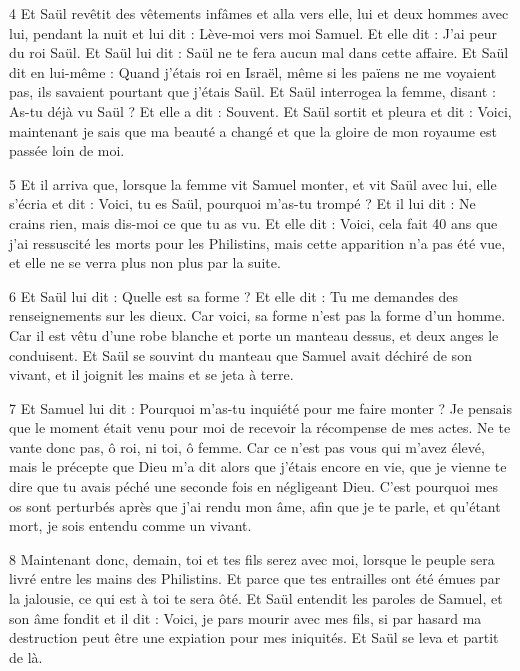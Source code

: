 \par 4 Et Saül revêtit des vêtements infâmes et alla vers elle, lui et deux hommes avec lui, pendant la nuit et lui dit : Lève-moi vers moi Samuel. Et elle dit : J'ai peur du roi Saül. Et Saül lui dit : Saül ne te fera aucun mal dans cette affaire. Et Saül dit en lui-même : Quand j'étais roi en Israël, même si les païens ne me voyaient pas, ils savaient pourtant que j'étais Saül. Et Saül interrogea la femme, disant : As-tu déjà vu Saül ? Et elle a dit : Souvent. Et Saül sortit et pleura et dit : Voici, maintenant je sais que ma beauté a changé et que la gloire de mon royaume est passée loin de moi.

\par 5 Et il arriva que, lorsque la femme vit Samuel monter, et vit Saül avec lui, elle s'écria et dit : Voici, tu es Saül, pourquoi m'as-tu trompé ? Et il lui dit : Ne crains rien, mais dis-moi ce que tu as vu. Et elle dit : Voici, cela fait 40 ans que j'ai ressuscité les morts pour les Philistins, mais cette apparition n'a pas été vue, et elle ne se verra plus non plus par la suite.

\par 6 Et Saül lui dit : Quelle est sa forme ? Et elle dit : Tu me demandes des renseignements sur les dieux. Car voici, sa forme n’est pas la forme d’un homme. Car il est vêtu d'une robe blanche et porte un manteau dessus, et deux anges le conduisent. Et Saül se souvint du manteau que Samuel avait déchiré de son vivant, et il joignit les mains et se jeta à terre.

\par 7 Et Samuel lui dit : Pourquoi m'as-tu inquiété pour me faire monter ? Je pensais que le moment était venu pour moi de recevoir la récompense de mes actes. Ne te vante donc pas, ô roi, ni toi, ô femme. Car ce n'est pas vous qui m'avez élevé, mais le précepte que Dieu m'a dit alors que j'étais encore en vie, que je vienne te dire que tu avais péché une seconde fois en négligeant Dieu. C'est pourquoi mes os sont perturbés après que j'ai rendu mon âme, afin que je te parle, et qu'étant mort, je sois entendu comme un vivant.

\par 8 Maintenant donc, demain, toi et tes fils serez avec moi, lorsque le peuple sera livré entre les mains des Philistins. Et parce que tes entrailles ont été émues par la jalousie, ce qui est à toi te sera ôté. Et Saül entendit les paroles de Samuel, et son âme fondit et il dit : Voici, je pars mourir avec mes fils, si par hasard ma destruction peut être une expiation pour mes iniquités. Et Saül se leva et partit de là.

